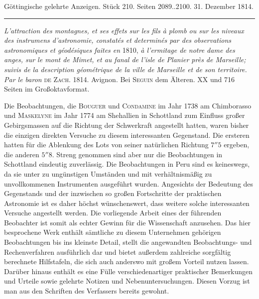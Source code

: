 \clearpage
{}
\hypertarget{native-574-lower}{}
\begin{center}\small Göttingische gelehrte Anzeigen. Stück 210. Seiten 2089..2100. 31. Dezember 1814.\\[3pt]\rule{.72\linewidth}{.3pt}\end{center}

\emph{L'attraction des montagnes, et ses effets sur les fils à plomb ou sur les niveaux des
instrumens d'astronomie, constatés et determinés par des observations astronomiques et
géodésiques faites en} 1810, \emph{à l'ermitage de notre dame des anges, sur le mont de Mimet, et
au fanal de l'isle de Planier près de Marseille; suivis de la description géométrique de la
ville de Marseille et de son territoire. Par le baron} \textsc{de Zach}. 1814.
Avignon. Bei \textsc{Seguin} dem Älteren. XX und 716 Seiten im Großoktavformat.

Die Beobachtungen, die \textsc{Bouguer} und \textsc{Condamine} im Jahr 1738 am Chimborasso und \textsc{Maskelyne} im Jahr 1774 am Shehallien in Schottland zum Einfluss großer Gebirgsmassen auf die Richtung der Schwerkraft angestellt hatten, waren bisher die einzigen direkten Versuche zu diesem interessanten Gegenstand. Die ersteren hatten für die Ablenkung des Lots von seiner natürlichen Richtung $7''5$ ergeben, die anderen $5''8$. Streng genommen sind aber nur die Beobachtungen in Schottland eindeutig zuverlässig. Die Beobachtungen in Peru sind es keineswegs, da sie unter zu ungünstigen Umständen und mit verhältnismäßig zu unvollkommenen Instrumenten ausgeführt wurden. Angesichts der Bedeutung des Gegenstands und der inzwischen so großen Fortschritte der praktischen Astronomie ist es daher höchst wünschenswert, dass weitere solche interessanten Versuche angestellt werden. Die vorliegende Arbeit eines der führenden Beobachter ist somit als echter Gewinn für die Wissenschaft anzusehen. Das hier besprochene Werk enthält sämtliche zu diesem Unternehmen gehörigen Beobachtungen bis ins kleinste Detail, stellt die angewandten Beobachtungs- und Rechenverfahren ausführlich dar und bietet außerdem zahlreiche sorgfältig berechnete Hilfstafeln, die sich auch anderswo mit großem Vorteil nutzen lassen. Darüber hinaus enthält es eine Fülle verschiedenartiger praktischer Bemerkungen und Urteile sowie gelehrte Notizen und Nebenuntersuchungen. Diesen Vorzug ist man aus den Schriften des Verfassers bereits gewohnt.

